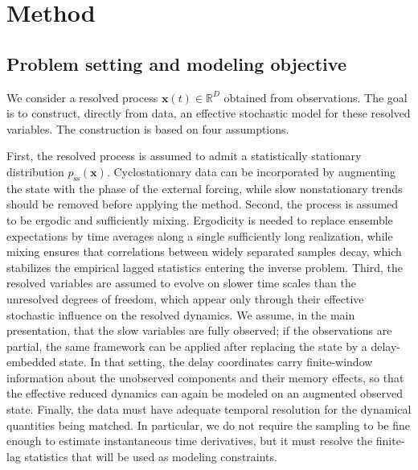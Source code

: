 \documentclass[11pt,twoside,fleqn]{article}
\begin{document}
\section{Method}
\label{sec:method}

\subsection{Problem setting and modeling objective}
\label{subsec:problem_setting_modeling_objective}

We consider a resolved process $\bm{x}(t)\in\mathbb{R}^D$ obtained from observations. The goal is to construct, directly from data, an effective stochastic model for these resolved variables. The construction is based on four assumptions.

First, the resolved process is assumed to admit a statistically stationary distribution $p_{\mathrm{ss}}(\bm{x})$. Cyclostationary data can be incorporated by augmenting the state with the phase of the external forcing, while slow nonstationary trends should be removed before applying the method. Second, the process is assumed to be ergodic and sufficiently mixing. Ergodicity is needed to replace ensemble expectations by time averages along a single sufficiently long realization, while mixing ensures that correlations between widely separated samples decay, which stabilizes the empirical lagged statistics entering the inverse problem. Third, the resolved variables are assumed to evolve on slower time scales than the unresolved degrees of freedom, which appear only through their effective stochastic influence on the resolved dynamics. We assume, in the main presentation, that the slow variables are fully observed; if the observations are partial, the same framework can be applied after replacing the state by a delay-embedded state. In that setting, the delay coordinates carry finite-window information about the unobserved components and their memory effects, so that the effective reduced dynamics can again be modeled on an augmented observed state. Finally, the data must have adequate temporal resolution for the dynamical quantities being matched. In particular, we do not require the sampling to be fine enough to estimate instantaneous time derivatives, but it must resolve the finite-lag statistics that will be used as modeling constraints.
\end{document}
